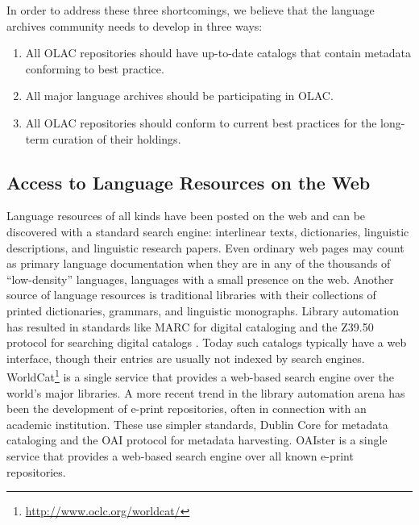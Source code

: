 
In order to address these three shortcomings, we believe that the
language archives community needs to develop in three ways:

\renewcommand{\labelenumi}{(\arabic{enumi})}
\begin{enumerate}\setlength{\itemsep}{0pt}
\item All OLAC repositories should have up-to-date catalogs
      that contain metadata conforming to best practice.
\item All major language archives should be participating in OLAC.
\item All OLAC repositories should conform to current best practices
      for the long-term curation of their holdings.
\end{enumerate}

\subsection{Access to Language Resources on the Web}


Language resources of all kinds have been posted on the web and can be
discovered with a standard search engine: interlinear texts,
dictionaries, linguistic descriptions, and linguistic research papers.
Even ordinary web pages may count as primary language documentation
when they are in any of the thousands of ``low-density'' languages,
languages with a small presence on the web.  Another source of
language resources is traditional libraries with their collections of
printed dictionaries, grammars, and linguistic monographs.  Library
automation has resulted in standards like MARC for digital cataloging
\citep{MARC}
and the Z39.50 protocol for searching digital catalogs \citep{Z3950}.
Today such catalogs typically have a web interface, though their entries are
usually not indexed by search engines.
WorldCat\footnote{\scriptsize\url{http://www.oclc.org/worldcat/}} is a single service
that provides a web-based search engine over the world's major
libraries. A more recent trend in the library automation arena has
been the development of e-print repositories, often in connection with
an academic institution.  These use simpler standards, Dublin Core for
metadata cataloging and the OAI protocol for
metadata harvesting.  OAIster is a single service that provides a
web-based search engine over all known e-print repositories.

